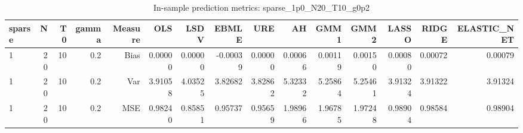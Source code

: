 \begin{table}[!htbp]\centering
\caption{In-sample prediction metrics: sparse_1p0_N20_T10_g0p2}
\label{tab:table2_sparse_1p0_N20_T10_g0p2}
\begin{tabular}{lrrrrrrrrrrrrrr}
\hline
sparse & N & T0 & gamma & Measure & OLS & LSDV & EBMLE & URE & AH & GMM1 & GMM2 & LASSO & RIDGE & ELASTIC_NET \\
\hline
1 & 20 & 10 & 0.2 & Bias & 0.00000 & 0.00000 & -0.00039 & 0.00000 & 0.00066 & 0.00119 & 0.00150 & 0.00080 & 0.00072 & 0.00079 \\
1 & 20 & 10 & 0.2 & Var & 3.91058 & 4.03525 & 3.82682 & 3.82862 & 5.32332 & 5.25864 & 5.25461 & 3.91324 & 3.91322 & 3.91324 \\
1 & 20 & 10 & 0.2 & MSE & 0.98240 & 0.85851 & 0.95737 & 0.95659 & 1.98966 & 1.96785 & 1.97248 & 0.98904 & 0.98584 & 0.98904 \\
\hline
\end{tabular}
\end{table}

